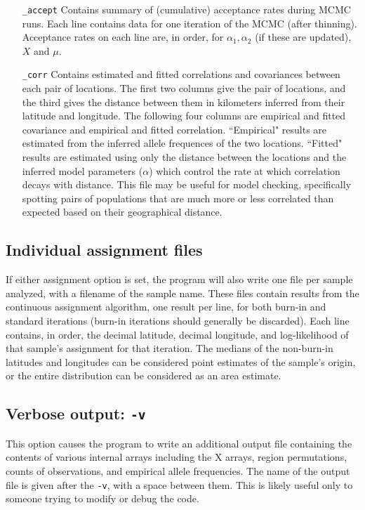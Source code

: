 \documentclass[10pt,titlepage,times,letterpaper]{article}
\begin{document}
\begin{enumerate}[\_params]
\item[{\tt \_accept}] Contains summary of (cumulative) acceptance rates
during MCMC runs. Each line contains data for one iteration of the
MCMC (after thinning). Acceptance rates on each line are, in order,
for $\alpha_1,\alpha_2$ (if these are updated), $X$ and $\mu$.
\item[{\tt \_corr}] Contains estimated and fitted correlations
and covariances between each pair of locations.  The first two columns
give the pair of locations, and the third gives the distance between them
in kilometers inferred from their latitude and longitude.  The following
four columns are empirical and fitted covariance and empirical and
fitted correlation.  ``Empirical" results are estimated from the inferred
allele frequences of the two locations.  ``Fitted" results are estimated
using only the distance between the locations and the inferred model
parameters ($\alpha$) which control the rate at which correlation decays
with distance.  This file may be useful for model checking, specifically
spotting pairs of populations that are much more or less correlated than
expected based on their geographical distance.
\end{enumerate}

\subsection{Individual assignment files}

If either assignment option is set, the program will also write one file
per sample analyzed, with a filename of the sample name.  These files
contain results from the continuous assignment algorithm, one result per
line, for both burn-in and standard iterations (burn-in iterations should
generally be discarded).  Each line contains, in order, the decimal
latitude, decimal longitude, and log-likelihood of that sample's assignment
for that iteration.  The medians of the non-burn-in latitudes and longitudes
can be considered point estimates of the sample's origin, or the
entire distribution can be considered as an area estimate.

\subsection{Verbose output: {\tt -v}}

This option causes the program to write an additional output file
containing the contents of various internal arrays including the
X arrays, region permutations, counts of observations, 
and empirical allele frequencies.  The name of the output file
is given after the {\tt -v}, with a space between them.  This is likely 
useful only to someone trying to modify or debug the code.
\end{document}
